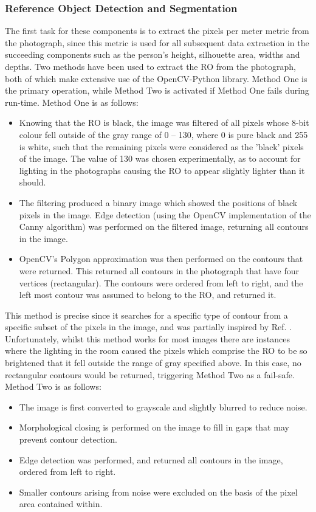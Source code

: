 \documentclass[conference]{IEEEtran}
\begin{document}
\subsubsection{Reference Object Detection and Segmentation} \label{refobdetseg}
The first task for these components is to extract the pixels per meter metric from the photograph, since this metric is used for all subsequent data extraction in the succeeding components such as the person's height, silhouette area, widths and depths.
Two methods have been used to extract the RO from the photograph, both of which make extensive use of the OpenCV-Python library.
Method One is the primary operation, while Method Two is activated if Method One fails during run-time.
Method One is as follows:
\begin{itemize}
	\item Knowing that the RO is black, the image was filtered of all pixels whose 8-bit colour fell outside of the gray range of 0 -- 130, where 0 is pure black and 255 is white, such that the remaining pixels were considered as the 'black' pixels of the image.
	The value of 130 was chosen experimentally, as to account for lighting in the photographs causing the RO to appear slightly lighter than it should.
	\item The filtering produced a binary image which showed the positions of black pixels in the image.
	Edge detection (using the OpenCV implementation of the Canny algorithm) was performed on the filtered image, returning all contours in the image.
	\item OpenCV's Polygon approximation was then performed on the contours that were returned.
	This returned all contours in the photograph that have four vertices (rectangular).
	The contours were ordered from left to right, and the left most contour was assumed to belong to the RO, and returned it.
\end{itemize}
This method is precise since it searches for a specific type of contour from a specific subset of the pixels in the image, and was partially inspired by Ref. \cite{blackShapeDetection}.
Unfortunately, whilst this method works for most images there are instances where the lighting in the room caused the pixels which comprise the RO to be so brightened that it fell outside the range of gray specified above.
In this case, no rectangular contours would be returned, triggering Method Two as a fail-safe. 
Method Two is as follows:
\begin{itemize}
	\item The image is first converted to grayscale and slightly blurred to reduce noise.
	\item Morphological closing is performed on the image to fill in gaps that may prevent contour detection.
	\item Edge detection was performed, and returned all contours in the image, ordered from left to right.
	\item Smaller contours arising from noise were excluded on the basis of the pixel area contained within.
\end{itemize}
\end{document}
